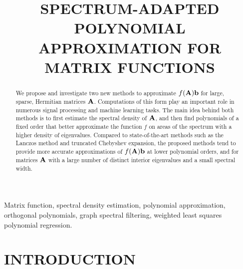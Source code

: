\documentclass{article}
\title{SPECTRUM-ADAPTED POLYNOMIAL APPROXIMATION FOR MATRIX FUNCTIONS}
\begin{document}
\ninept
%
\maketitle
%
\begin{abstract}
We propose and investigate two new methods to approximate $f({\bf A}){\bf b}$ for large, sparse, Hermitian matrices ${\bf A}$. Computations of this form play an important role in numerous signal processing and machine learning tasks. The main idea behind both methods is to first estimate the spectral density of ${\bf A}$, and then find polynomials of a fixed order that better approximate the function $f$ on areas of the spectrum with a higher density of eigenvalues. %
Compared to state-of-the-art methods such as the Lanczos method and truncated Chebyshev expansion, the proposed methods tend to provide more accurate approximations of $f({\bf A}){\bf b}$ at lower polynomial orders, and for matrices ${\bf A}$ with a large number of distinct interior eigenvalues and a small spectral width. 
\end{abstract}
%
\begin{keywords}
Matrix function, spectral density estimation, polynomial approximation, orthogonal polynomials, graph spectral filtering, weighted least squares polynomial regression.
\end{keywords}
%
\section{INTRODUCTION} \label{Se:intro}
\end{document}
